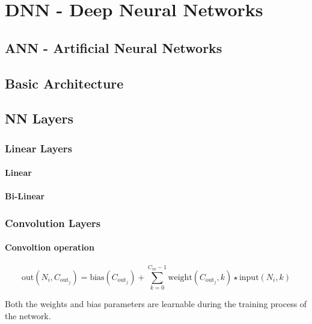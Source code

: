 

\chapter{DNN - Deep Neural Networks}
\section{ANN - Artificial Neural Networks}
\section{Basic Architecture}

\section{NN Layers}
\subsection{Linear Layers}
\subsubsection{Linear}
\subsubsection{Bi-Linear}

\subsection{Convolution Layers}
\subsubsection{Convoltion operation}
\begin{equation} \label{eq:conv_operation}
    \text{out}(N_i, C_{\text{out}_j}) = \text{bias}(C_{\text{out}_j}) +
    \sum_{k = 0}^{C_{in} - 1} \text{weight}(C_{\text{out}_j}, k)
    \star \text{input}(N_i, k)  
\end{equation}

Both the weights and bias parameters are learnable during the training
process of the network.

